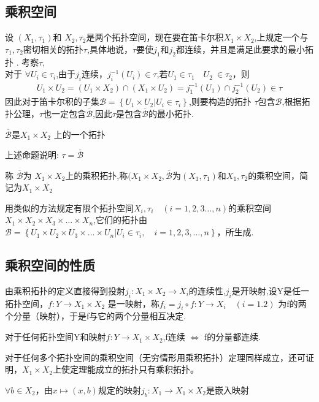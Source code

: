 \subsection*{乘积空间}
设 \((X_1,\tau_1)\)和 \(X_2,\tau_2\)是两个拓扑空间，现在要在笛卡尔积\(X_1 \times X_2\),上规定一个与\(\tau_1,\tau_2\)密切相关的拓扑\(\tau\),具体地说，\(\tau\)要使\(j_1\)和\(j_2\)都连续，并且是满足此要求的最小拓扑 . 考察\(\tau \),\\
对于 \(\forall U_i \in \tau_i\),由于\(j_i\)连续，\(j_i^{-1} (U_i) \in \tau \),若\(U_1 \in \tau_1 \quad U_2\ \in \tau_2\)，则\begin{align}
    U_1 \times U_2 = (U_1 \times X_2) \cap (X_1 \times U_2) = j_1^{-1}(U_1) \cap j_2^{-1}(U_2) \in \tau  
\end{align}
因此对于笛卡尔积的子集\(\mathscr{B} = \left\{U_1 \times U_2 | U_i \in \tau_i \right\} \),则要构造的拓扑 \(\tau\)包含\(\mathscr{B}\),根据拓扑公理，\(\tau\)也一定包含\(\overline{\mathscr{B}}\),因此\(\tau\)是包含\(\overline{\mathscr{B}}\)的最小拓扑.
\begin{corollary}
    \(\overline{\mathscr{B}}\)是\(X_1 \times X_2\) 上的一个拓扑
\end{corollary}
上述命题说明: \(\tau = \overline{\mathscr{B}}\)
\begin{definition}
    称 \(\overline{\mathscr{B}}\)为 \(X_1\times X_2\)上的乘积拓扑,称\((X_1 \times X_2 ,\overline{\mathscr{B}}\)为\((X_1,\tau_1)\)和\(X_1,\tau_2\)的乘积空间，简记为\(X_1 \times X_2\)
\end{definition}
\begin{example}
    用类似的方法规定有限个拓扑空间\(X_i,\tau_i \quad (i=1,2,3 \dots , n )\)的乘积空间\(X_1 \times X_2 \times X_3 \times \dots \times X_n\),它们的拓扑由\(\mathscr{B}=\left\{U_1 \times U_2 \times U_3 \times \dots \times U_n| U_i \in \tau_i ,\quad i= 1,2,3,\dots ,n \right\}\)，所生成.
\end{example}
\subsection*{乘积空间的性质}
由乘积拓扑的定义直接得到投射\(j_i : X_1\times X_2 \rightarrow X_i\)的连续性,\(j_i\)是开映射,设Y是任一拓扑空间，\(f:Y \rightarrow X_1 \times X_2\) 是一映射，称\(f_i = j_i \circ f : Y\rightarrow X_i \quad (i=1.2)\) 为f的两个分量（映射），于是f与它的两个分量相互决定.
\begin{theorem}
    对于任何拓扑空间Y和映射\(f: Y \rightarrow X_1 \times X_2\),f连续 \(\Leftrightarrow \) f的分量都连续.
\end{theorem}
对于任何多个拓扑空间的乘积空间（无穷情形用乘积拓扑）定理同样成立，还可证明，\(X_1 \times X_2\)上使定理能成立的拓扑只有乘积拓扑。
\begin{lemma}
    \(\forall b \in X_2\)，由\(x \mapsto (x,b) \)规定的映射\(j_b : X_1 \rightarrow X_1 \times X_2\)是嵌入映射 
\end{lemma}
